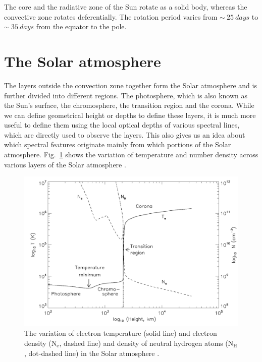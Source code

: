 The core and the radiative zone of the Sun rotate as a solid body, whereas the convective zone rotates deferentially. The rotation period varies from $\sim~25~days$ to $\sim~35~days$ from the equator to the pole.

\section{The Solar atmosphere}\label{solar_atmos}

The layers outside the convection zone together form the Solar atmosphere and is further divided into different regions. The photosphere, which is also known as the Sun's surface, the chromosphere, the transition region and the corona. While we can define geometrical height or depths to define these layers, it is much more useful to define them using the local optical depths of various spectral lines, which are directly used to observe the layers. This also gives us an idea about which spectral features originate mainly from which portions of the Solar atmosphere. Fig.~\ref{fig_solar_atm} shows the variation of temperature and number density across various layers of the Solar atmosphere \citep{philips08}. 

\begin{figure}[ht!]
    \centering
    \includegraphics[width = 0.8\linewidth]{Figures/solar_atm.png}
    \caption[Density and temperature profiles across various layers of the Sun.]{The variation of electron temperature (solid line) and electron density ($\mathrm{N_{e}}$, dashed line) and density of neutral hydrogen atoms ($\mathrm{N_{H}}$, dot-dashed line) in the Solar atmosphere \citep{philips08}.}
    \label{fig_solar_atm}
\end{figure}

